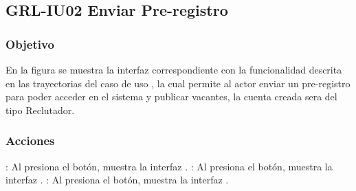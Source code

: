 \clearpage
\subsection{GRL-IU02 Enviar Pre-registro}

\subsubsection{Objetivo}
En la figura  se muestra la interfaz correspondiente con la funcionalidad descrita en las
trayectorias del caso de uso  , la cual permite al actor enviar un pre-registro para poder acceder 
en el sistema y publicar vacantes, la cuenta creada sera del tipo Reclutador.

\subsubsection{Acciones}


\Titem {} : Al presiona el botón, muestra la interfaz .
\Titem {} : Al presiona el botón, muestra la interfaz .
\Titem {} : Al presiona el botón, muestra la interfaz .



\clearpage

